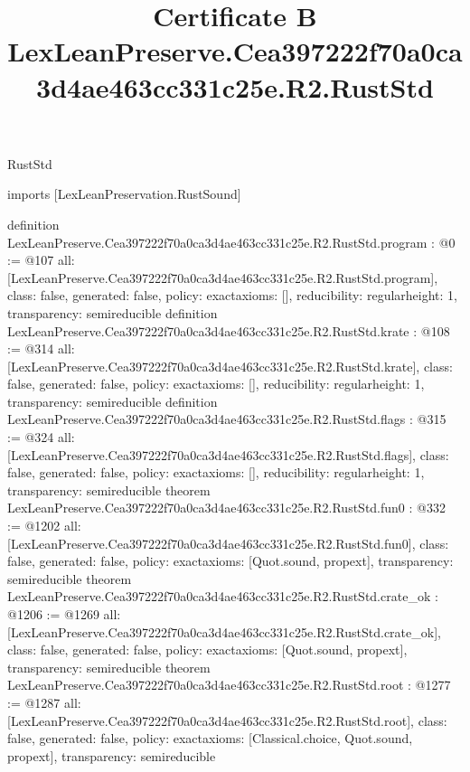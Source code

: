 \begin{lexlean}{RustStd}
\title{Certificate B LexLeanPreserve.Cea397222f70a0ca3d4ae463cc331c25e.R2.RustStd}
\begin{coremodule}
imports [LexLeanPreservation.RustSound]

definition LexLeanPreserve.Cea397222f70a0ca3d4ae463cc331c25e.R2.RustStd.program : @0 := @107 {
  all: [LexLeanPreserve.Cea397222f70a0ca3d4ae463cc331c25e.R2.RustStd.program],
  class: false,
  generated: false,
  policy: exact{axioms: []},
  reducibility: regular{height: 1},
  transparency: semireducible
}
definition LexLeanPreserve.Cea397222f70a0ca3d4ae463cc331c25e.R2.RustStd.krate : @108 := @314 {
  all: [LexLeanPreserve.Cea397222f70a0ca3d4ae463cc331c25e.R2.RustStd.krate],
  class: false,
  generated: false,
  policy: exact{axioms: []},
  reducibility: regular{height: 1},
  transparency: semireducible
}
definition LexLeanPreserve.Cea397222f70a0ca3d4ae463cc331c25e.R2.RustStd.flags : @315 := @324 {
  all: [LexLeanPreserve.Cea397222f70a0ca3d4ae463cc331c25e.R2.RustStd.flags],
  class: false,
  generated: false,
  policy: exact{axioms: []},
  reducibility: regular{height: 1},
  transparency: semireducible
}
theorem LexLeanPreserve.Cea397222f70a0ca3d4ae463cc331c25e.R2.RustStd.fun0 : @332 := @1202 {
  all: [LexLeanPreserve.Cea397222f70a0ca3d4ae463cc331c25e.R2.RustStd.fun0],
  class: false,
  generated: false,
  policy: exact{axioms: [Quot.sound, propext]},
  transparency: semireducible
}
theorem LexLeanPreserve.Cea397222f70a0ca3d4ae463cc331c25e.R2.RustStd.crate_ok : @1206 := @1269 {
  all: [LexLeanPreserve.Cea397222f70a0ca3d4ae463cc331c25e.R2.RustStd.crate_ok],
  class: false,
  generated: false,
  policy: exact{axioms: [Quot.sound, propext]},
  transparency: semireducible
}
theorem LexLeanPreserve.Cea397222f70a0ca3d4ae463cc331c25e.R2.RustStd.root : @1277 := @1287 {
  all: [LexLeanPreserve.Cea397222f70a0ca3d4ae463cc331c25e.R2.RustStd.root],
  class: false,
  generated: false,
  policy: exact{axioms: [Classical.choice, Quot.sound, propext]},
  transparency: semireducible
}


\end{coremodule}
\end{lexlean}
